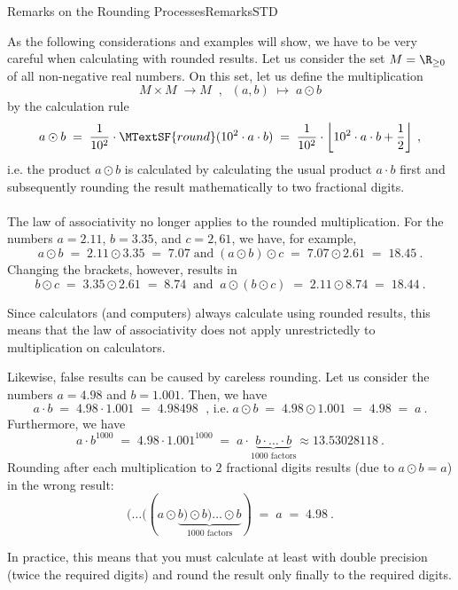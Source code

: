 \begin{MXContent}{Remarks on the Rounding Processes}{Remarks}{STD}

As the following considerations and examples will show, we have to be very careful when calculating with rounded results. 
Let us consider the set $M=\R_{\geq0}$ of all non-negative real numbers. On this set, let us define the 
multiplication
$$
M\times M \;\longrightarrow M\;\; , \;\;
(a,b)\;\longmapsto\; a\odot b
$$
by the calculation rule
$$
a\odot b \; =\; \frac{1}{10^{2}}\cdot \MTextSF{round}( 10^{2}\cdot a \cdot b)\; =\; \frac{1}{10^{2}}\cdot \left\lfloor{ 10^{2}\cdot a \cdot b + \frac{1}{2} }\right\rfloor\: ,
$$
i.e. the product $a\odot b$ is calculated by calculating the usual product $a\cdot b$ first and subsequently rounding the result mathematically 
to two fractional digits.
\ \\ \ \\
The law of associativity no longer applies to the rounded multiplication. For the numbers 
$a=2.11$, $b=3.35$, and $c=2,61$, we have, for example,
$$
a\odot b \;=\; 2.11 \odot 3.35 \; =\; 7.07\;\text{and}\;
(a\odot b)\odot c \; =\; 7.07 \odot 2.61 \;=\;  18.45\: .
$$
Changing the brackets, however, results in
$$
b\odot c\;  =\; 3.35 \odot 2.61 \; =\; 8.74\;\;\text{and}\;\;a\odot (b\odot c)\; =\;2.11 \odot 8.74 \;=\; 18.44\: .
$$

\begin{MInfo}
Since calculators (and computers) always calculate using rounded results, this means that the 
law of associativity does not apply unrestrictedly to multiplication on calculators.
\end{MInfo}

Likewise, false results can be caused by careless rounding. Let us consider the numbers $a=4.98$ and $b=1.001$. Then, we have
$$
a\cdot b\; =\; 4.98 \cdot 1.001\; =\; 4.98498\;\text{ , i.e.}\;
a\odot b \; =\; 4.98 \odot 1.001\; =\; 4.98\; =\; a\: .
$$
Furthermore, we have
$$
a\cdot b^{1000}\; =\; 4.98 \cdot 1.001^{1000} \;=\; a\cdot \underbrace{b\cdot \ldots \cdot b}_{1000 \text{ factors}} \approx 13.53028118\: .
$$
Rounding after each multiplication to $2$ fractional digits results (due to $a\odot b=a$) in the wrong result:
$$
(\ldots ((a\odot \underbrace{b) \odot b) \ldots \odot b}_{1000 \text{ factors}}) \;=\;  a\; =\;4.98 \: .
$$

\begin{MInfo}
In practice, this means that you must calculate at least with double precision (twice the required digits) and round the result only finally 
to the required digits.
\end{MInfo}

\end{MXContent}

